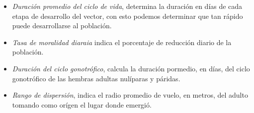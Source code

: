 \begin{itemize}
    \item \textit{Duración promedio del ciclo de vida}, determina la duración en días de cada etapa de desarrollo del vector, con esto podemos determinar que tan rápido puede desarrollarse al población.

    \item \textit{Tasa de moralidad diaraia} indica el porcentaje de reducción diario de la población.

    \item \textit{Duración del ciclo gonotrófico}, calcula la duración pormedio, en días, del ciclo gonotrófico de las hembras adultas nulíparas y páridas.

    \item \textit{Rango de dispersión}, indica el radio promedio de vuelo, en metros, del adulto tomando como orígen el lugar donde emergió.

\end{itemize}
